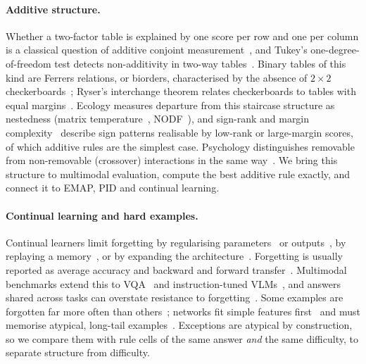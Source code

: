 \paragraph{Additive structure.}
Whether a two-factor table is explained by one score per row and one per column is a classical question of additive
conjoint measurement~\cite{luce1964simultaneous,krantz1971foundations}, and Tukey's one-degree-of-freedom test detects
non-additivity in two-way tables~\cite{tukey1949one}. Binary tables of this kind are Ferrers relations, or biorders,
characterised by the absence of $2{\times}2$ checkerboards~\cite{ducamp1969composite,doignon1984realizable}; Ryser's
interchange theorem relates checkerboards to tables with equal margins~\cite{ryser1957combinatorial}. Ecology measures
departure from this staircase structure as nestedness (matrix temperature~\cite{atmar1993measure},
NODF~\cite{almeidaneto2008consistent}), and sign-rank and margin complexity~\cite{alon1985geometrical,linial2007complexity}
describe sign patterns realisable by low-rank or large-margin scores, of which additive rules are the simplest case.
Psychology distinguishes removable from non-removable (crossover) interactions in the same
way~\cite{loftus1978interpretation,wagenmakers2012interpretation}. We bring this structure to multimodal evaluation,
compute the best additive rule exactly, and connect it to EMAP, PID and continual learning.

\paragraph{Continual learning and hard examples.}
Continual learners limit forgetting by regularising parameters~\cite{kirkpatrick2017overcoming,zenke2017continual} or
outputs~\cite{li2017learning}, by replaying a memory~\cite{chaudhry2019tiny,lopezpaz2017gradient,chaudhry2019efficient,rebuffi2017icarl,buzzega2020dark},
or by expanding the architecture~\cite{yan2021der}. Forgetting is usually reported as average accuracy and backward and
forward transfer~\cite{lopezpaz2017gradient,delange2021continual}. Multimodal benchmarks extend this to
VQA~\cite{zhang2023vqacl,lei2023symbolic,zhang2025clcrossvqa} and instruction-tuned VLMs~\cite{chen2024coin}, and answers
shared across tasks can overstate resistance to forgetting~\cite{gao2026reevaluating}. Some examples are forgotten far
more often than others~\cite{toneva2019empirical}; networks fit simple features first~\cite{shah2020pitfalls} and must
memorise atypical, long-tail examples~\cite{feldman2020does,feldman2020neural}. Exceptions are atypical by construction,
so we compare them with rule cells of the same answer \emph{and} the same difficulty, to separate structure from
difficulty.
